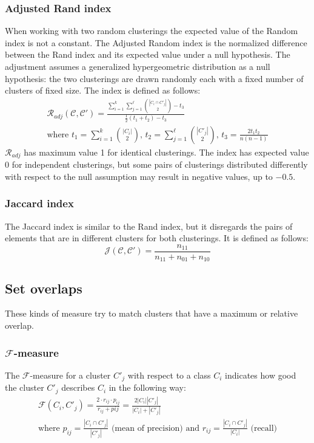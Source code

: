 \subsubsection{Adjusted Rand index}
When working with two random clusterings the expected value of the Random index is not a constant. The Adjusted Random index is the normalized difference between the Rand index and its expected value under a null hypothesis. The adjustment assumes a generalized hypergeometric distribution as a null hypothesis: the two clusterings are drawn randomly each with a fixed number of clusters of fixed size. 
The index is defined as follows:
\begin{equation*}
    \begin{gathered}
       \mathcal{R}_{adj}(\mathcal{C},\mathcal{C}')=\frac{\sum_{i=1}^k\sum_{j=1}^\ell\binom{|C_i\cap C'_j|}{2}-t_3}{\frac{1}{2}(t_1+t_2)-t_3} \\
       \text{where } t_1=\sum_{i=1}^k\binom{|C_i|}{2}\text{, }t_2=\sum_{j=1}^\ell\binom{|C'_j|}{2}\text{, }t_3=\frac{2t_1t_2}{n(n-1)}
    \end{gathered}    
\end{equation*}
$\mathcal{R}_{adj}$ has maximum value 1 for identical clusterings. The index has expected value 0 for independent clusterings, but some pairs of clusterings distributed differently with respect to the null assumption may result in negative values, up to $-0.5$.

\subsubsection{Jaccard index}
The Jaccard index is similar to the Rand index, but it disregards the pairs of elements that are in different clusters for both clusterings. It is defined as follows:
\begin{equation*}
    \mathcal{J}(\mathcal{C},\mathcal{C}')=\frac{n_{11}}{n_{11}+n_{01}+n_{10}}
\end{equation*}

\subsection{Set overlaps}
These kinds of measure try to match clusters that have a maximum or relative overlap.

\subsubsection{$\mathcal{F}$-measure}
The $\mathcal{F}$-measure for a cluster $C'_j$ with respect to a class $C_i$ indicates how good the cluster $C'_j$ describes $C_i$ in the following way:
\begin{equation*}
    \begin{gathered}
        \mathcal{F}(C_i,C'_j)=\frac{2\cdot r_{ij}\cdot p_{ij}}{r_{ij}+p{ij}}=\frac{2|C_i||C'_j|}{|C_i|+|C'_j|}\\
        \text{where }p_{ij}=\frac{|C_i\cap C'_j|}{|C'_j|} \text{ (mean of precision) and } r_{ij}=\frac{|C_i\cap C'_j|}{|C_i|} \text{ (recall)}
    \end{gathered}
\end{equation*}

